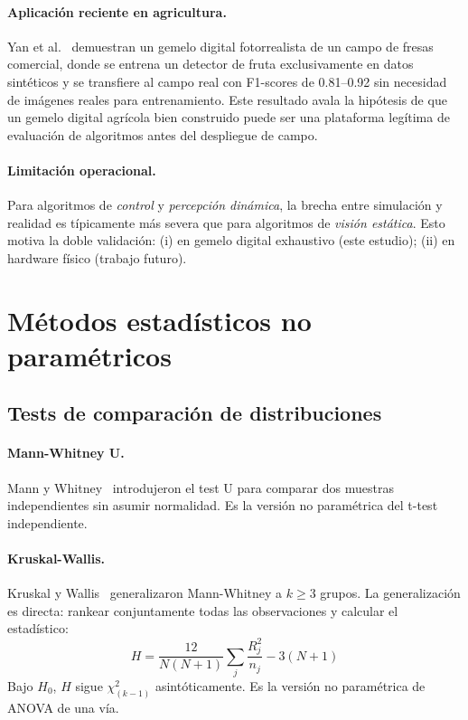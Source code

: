 \documentclass[12pt,a4paper,oneside]{book}
\begin{document}
\paragraph{Aplicación reciente en agricultura.} Yan et al.~\cite{Yan2025} demuestran un gemelo digital fotorrealista de un campo de fresas comercial, donde se entrena un detector de fruta exclusivamente en datos sintéticos y se transfiere al campo real con F1-scores de 0.81--0.92 sin necesidad de imágenes reales para entrenamiento. Este resultado avala la hipótesis de que un gemelo digital agrícola bien construido puede ser una plataforma legítima de evaluación de algoritmos antes del despliegue de campo.

\paragraph{Limitación operacional.} Para algoritmos de \emph{control} y \emph{percepción dinámica}, la brecha entre simulación y realidad es típicamente más severa que para algoritmos de \emph{visión estática}. Esto motiva la doble validación: (i) en gemelo digital exhaustivo (este estudio); (ii) en hardware físico (trabajo futuro).

\newpage
\section{Métodos estadísticos no paramétricos}
\label{doc7:sec:stats}

\subsection{Tests de comparación de distribuciones}

\paragraph{Mann-Whitney U.} Mann y Whitney~\cite{Mann1947} introdujeron el test U para comparar dos muestras independientes sin asumir normalidad. Es la versión no paramétrica del t-test independiente.

\paragraph{Kruskal-Wallis.} Kruskal y Wallis~\cite{Kruskal1952} generalizaron Mann-Whitney a $k \geq 3$ grupos. La generalización es directa: rankear conjuntamente todas las observaciones y calcular el estadístico:
\begin{equation}
H = \frac{12}{N(N+1)} \sum_j \frac{R_j^2}{n_j} - 3(N+1)
\end{equation}
Bajo $H_0$, $H$ sigue $\chi^2_{(k-1)}$ asintóticamente. Es la versión no paramétrica de ANOVA de una vía.
\end{document}
